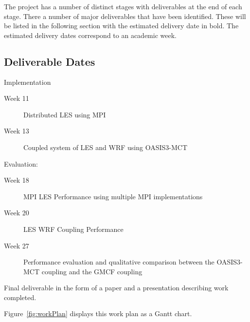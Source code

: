 The project has a number of distinct stages with deliverables at the end of each
stage. There a number of major deliverables that have been identified. These
will be listed in the following section with the estimated delivery date in
bold. The estimated delivery dates correspond to an academic week.

\subsection{Deliverable Dates}

\begin{description}
    \item
    \item[Week 13] Implementation
    \begin{description}
        \item[Week 11] Distributed LES using MPI
        \item[Week 13] Coupled system of LES and WRF using OASIS3-MCT
    \end{description}
    \item[Week 27] Evaluation:
    \begin{description}
        \item[Week 18] MPI LES Performance using multiple MPI implementations
        \item[Week 20] LES WRF Coupling Performance
        \item[Week 27] Performance evaluation and qualitative comparison between
        the OASIS3-MCT coupling and the GMCF coupling
    \end{description}
    \item[Week 31] Final deliverable in the form of a paper and a presentation
    describing work completed.
\end{description}

Figure~\ref{fig:workPlan} displays this work plan as a Gantt chart.

